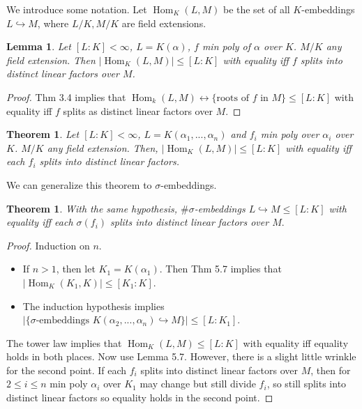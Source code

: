 \documentclass{article}
\theoremstyle{definition}
\theoremstyle{remark}
\theoremstyle{plain}
\newtheorem{lem}[defn]{Lemma}
\newtheorem{thm}[defn]{Theorem}
\newtheorem*{thm*}{Theorem}
\newcommand{\Hom}{\operatorname{Hom}}
\begin{document}
We introduce some notation. Let $\Hom_K(L,M)$ be the set of all $K$-embeddings $L\hookrightarrow M$, where $L/K, M/K$ are field extensions.

\begin{lem}
    Let $[L:K]<\infty$, $L=K(\alpha)$, $f$ min poly of $\alpha$ over $K$. $M/K$ any field extension. Then $|\Hom_K(L,M)|\le [L:K]$ with equality iff $f$ splits into distinct linear factors over $M$.
\end{lem}
\begin{proof}
    Thm 3.4 implies that $\Hom_k(L,M)\leftrightarrow\{\text{roots of }f\text{ in }M\}\le[L:K]$ with equality iff $f$ splits as distinct linear factors over $M$.
\end{proof}
\begin{thm}
    Let $[L:K]<\infty$, $L=K(\alpha_1,...,\alpha_n)$ and $f_i$ min poly over $\alpha_i$ over $K$. $M/K$ any field extension. Then, $|\Hom_K(L,M)|\le[L:K]$ with equality iff each $f_i$ splits into distinct linear factors.
\end{thm}
We can generalize this theorem to $\sigma$-embeddings.
\begin{thm*}
    With the same hypothesis, $\#\sigma$-embeddings $L\hookrightarrow M\le [L:K]$ with equality iff each $\sigma(f_i)$ splits into distinct linear factors over $M.$
\end{thm*}
\begin{proof}
    Induction on $n$. 
    \begin{itemize}
        \item If $n>1$, then let $K_1=K(\alpha_1)$. Then Thm 5.7 implies that $|\Hom_K(K_1,K)|\le[K_1:K]$.
        \item The induction hypothesis implies $|\{\sigma\text{-embeddings }K(\alpha_2,...,\alpha_n)\hookrightarrow M\}|\le[L:K_1]$.
    \end{itemize}
    The tower law implies that $\Hom_K(L,M)\le [L:K]$ with equality iff equality holds in both places. Now use Lemma 5.7. 
    However, there is a slight little wrinkle for the second point. If each $f_i$ splits into distinct linear factors over $M$, then for $2\le i\le n$ min poly $\alpha_i$ over $K_1$ may change but still divide $f_i$, so still splits into distinct linear factors so equality holds in the second point.
\end{proof}
\end{document}
